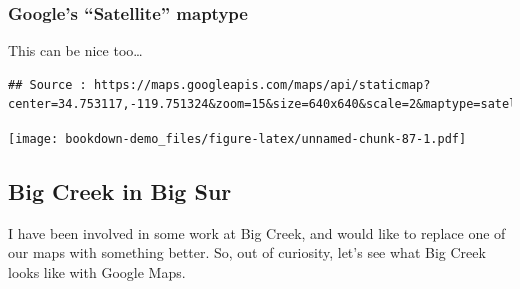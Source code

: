 \documentclass[]{book}
\newenvironment{Shaded}{\begin{snugshade}}{\end{snugshade}}
\newcommand{\KeywordTok}[1]{\textcolor[rgb]{0.13,0.29,0.53}{\textbf{{#1}}}}
\newcommand{\DataTypeTok}[1]{\textcolor[rgb]{0.13,0.29,0.53}{{#1}}}
\newcommand{\DecValTok}[1]{\textcolor[rgb]{0.00,0.00,0.81}{{#1}}}
\newcommand{\FloatTok}[1]{\textcolor[rgb]{0.00,0.00,0.81}{{#1}}}
\newcommand{\StringTok}[1]{\textcolor[rgb]{0.31,0.60,0.02}{{#1}}}
\newcommand{\NormalTok}[1]{{#1}}
\theoremstyle{definition}
\theoremstyle{definition}
\theoremstyle{remark}
\begin{document}
\subsubsection{\texorpdfstring{Google's ``Satellite''
maptype}{Google's Satellite maptype}}\label{googles-satellite-maptype}

This can be nice too\ldots{}

\begin{Shaded}
\end{Shaded}

\begin{verbatim}
## Source : https://maps.googleapis.com/maps/api/staticmap?center=34.753117,-119.751324&zoom=15&size=640x640&scale=2&maptype=satellite
\end{verbatim}

\texttt{[image: bookdown-demo\_files/figure-latex/unnamed-chunk-87-1.pdf]}

\subsection{Big Creek in Big Sur}\label{big-creek-in-big-sur}

I have been involved in some work at Big Creek, and would like to
replace one of our maps with something better. So, out of curiosity,
let's see what Big Creek looks like with Google Maps.
\end{document}
